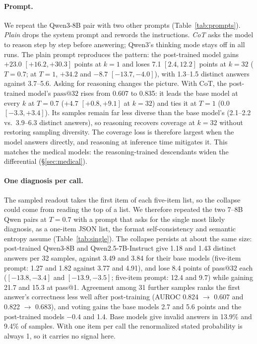 \documentclass[wcp]{jmlr}
\makeatletter
\newcommand{\passk}[1]{\mathrm{pass@}#1}
\makeatother
\begin{document}
\paragraph{Prompt.} We repeat the Qwen3-8B pair with two other prompts (Table~\ref{tab:prompts}). \emph{Plain} drops the system prompt and rewords the instructions. \emph{CoT} asks the model to reason step by step before answering; Qwen3's thinking mode stays off in all runs.
The plain prompt reproduces the pattern: the post-trained model gains $+23.0$ $[+16.2,+30.3]$ points at $k{=}1$ and loses 7.1 $[2.4,12.2]$ points at $k{=}32$ ($T{=}0.7$; at $T{=}1$, $+34.2$ and $-8.7$ $[-13.7,-4.0]$), with 1.3--1.5 distinct answers against 3.7--5.6.
Asking for reasoning changes the picture. With CoT, the post-trained model's $\passk{32}$ rises from 0.607 to 0.835: it leads the base model at every $k$ at $T{=}0.7$ ($+4.7$ $[+0.8,+9.1]$ at $k{=}32$) and ties it at $T{=}1$ ($0.0$ $[-3.3,+3.4]$).
Its samples remain far less diverse than the base model's (2.1--2.2 vs.\ 3.9--6.3 distinct answers), so reasoning recovers coverage at $k{=}32$ without restoring sampling diversity.
The coverage loss is therefore largest when the model answers directly, and reasoning at inference time mitigates it. This matches the medical models: the reasoning-trained descendants widen the differential (\S\ref{sec:medical}).

\paragraph{One diagnosis per call.} The sampled readout takes the first item of each five-item list, so the collapse could come from reading the top of a list. We therefore repeated the two 7--8B Qwen pairs at $T{=}0.7$ with a prompt that asks for the single most likely diagnosis, as a one-item JSON list, the format self-consistency and semantic entropy assume (Table~\ref{tab:single}). The collapse persists at about the same size: post-trained Qwen3-8B and Qwen2.5-7B-Instruct give 1.18 and 1.43 distinct answers per 32 samples, against 3.49 and 3.84 for their base models (five-item prompt: 1.27 and 1.82 against 3.77 and 4.91), and lose 8.4 points of pass@32 each ($[-13.8,-3.4]$ and $[-13.9,-3.5]$; five-item prompt: 12.4 and 9.7) while gaining 21.7 and 15.3 at pass@1. Agreement among 31 further samples ranks the first answer's correctness less well after post-training (AUROC 0.824 $\rightarrow$ 0.607 and 0.822 $\rightarrow$ 0.683), and voting gains the base models 2.7 and 5.6 points and the post-trained models $-0.4$ and 1.4. Base models give invalid answers in 13.9\% and 9.4\% of samples. With one item per call the renormalized stated probability is always 1, so it carries no signal here.
\end{document}
